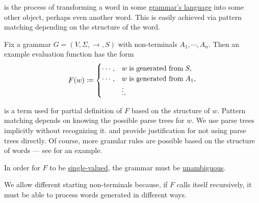 \begin{remark}\label{rem:evaluation}
   is the process of transforming a word in some \hyperref[def:formal_grammar/language]{grammar's language} into some other object, perhaps even another word. This is easily achieved via pattern matching depending on the structure of the word.

  Fix a grammar \( G = (V, \Sigma, \to, S) \) with non-terminals \( A_1, \cdots, A_n \). Then an example evaluation function has the form
  \begin{equation}\label{eq:rem:evaluation}
    F(w) \coloneqq \begin{cases}
      \cdots, &w \T{is generated from} S, \\
      \cdots, &w \T{is generated from} A_1, \\
              &\vdots,
    \end{cases}
  \end{equation}

   is a term used for partial definition of \( F \) based on the structure of \( w \). Pattern matching depends on knowing the possible parse trees for \( w \). We use parse trees implicitly without recognizing it.  and  provide justification for not using parse trees directly. Of course, more granular rules are possible based on the structure of words --- see  for an example.
\end{remark}
\begin{comments}
  \item In order for \( F \) to be \hyperref[def:function]{single-valued}, the grammar must be \hyperref[def:grammar_derivation/unambiguous]{unambiguous}.
  \item We allow different starting non-terminals because, if \( F \) calls itself recursively, it must be able to process words generated in different ways.
\end{comments}

